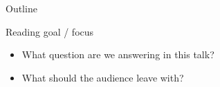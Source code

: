 \begin{frame}
  \titlepage
\end{frame}

\begin{frame}{Outline}
  \tableofcontents
\end{frame}

\begin{frame}{Reading goal / focus}
  \begin{itemize}
    \item What question are we answering in this talk?
    \item What should the audience leave with?
  \end{itemize}
\end{frame}
